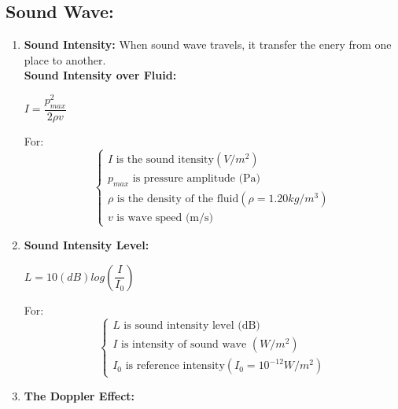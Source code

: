 \documentclass[10pt]{article}
\begin{document}
\subsection{Sound Wave:}
\begin{enumerate}
	\item \textbf{Sound Intensity:} When sound wave travels, it transfer the enery from one place to another. \\
	\bigbreak
	\textbf{Sound Intensity over Fluid: } \\
	\begin{mybox}
		\begin{center}
			$I = \dfrac{p_{max}^{2}}{2 \rho v}$
		\end{center}
	\end{mybox}
	For: \\
	$$
	\begin{cases}
		I \mbox{ is the sound itensity} (V/m^{2}) \\
		p_{max} \mbox{ is pressure amplitude (Pa)} \\
		\rho \mbox{ is the density of the fluid} (\rho = 1.20 kg/m^{3}) \\
		v \mbox{ is wave speed (m/s)}
	\end{cases}
	$$
	\item \textbf{Sound Intensity Level: } \\
	\begin{mybox}
		\begin{center}
			$L = 10(dB) log(\dfrac{I}{I_{0}})$
		\end{center}
	\end{mybox}
	For: \\
	$$
	\begin{cases}
		L \mbox{ is sound intensity level (dB)} \\
		I \mbox{ is intensity of sound wave } (W/m^{2}) \\
		I_{0} \mbox{ is reference intensity} (I_{0} = 10^{-12} W/m^{2})
	\end{cases}
	$$
	\item \textbf{The Doppler Effect: } \\
\end{enumerate} 
\end{document}
